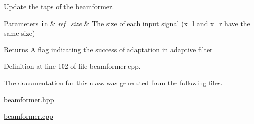 Update the taps of the beamformer. 


\begin{DoxyParams}[1]{Parameters}
\mbox{\tt in}  & {\em ref\+\_\+size} & The size of each input signal (x\+\_\+l and x\+\_\+r have the same size) \\
\hline
\end{DoxyParams}
\begin{DoxyReturn}{Returns}
A flag indicating the success of adaptation in adaptive filter 
\end{DoxyReturn}


Definition at line 102 of file beamformer.\+cpp.



The documentation for this class was generated from the following files\+:\begin{DoxyCompactItemize}
\item 
\hyperlink{beamformer_8hpp}{beamformer.\+hpp}\item 
\hyperlink{beamformer_8cpp}{beamformer.\+cpp}\end{DoxyCompactItemize}
